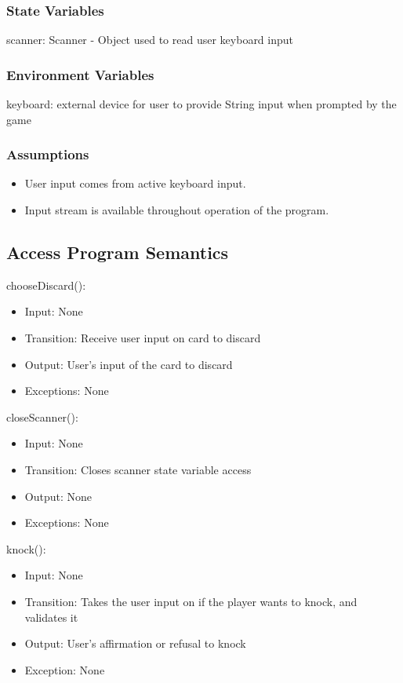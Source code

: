 \documentclass[12pt, titlepage]{article}
\begin{document}
\subsubsection{State Variables}
scanner: Scanner - Object used to read user keyboard input

\subsubsection{Environment Variables}
keyboard: external device for user to provide String input when prompted by the game

\subsubsection{Assumptions}
\begin{itemize}
    \item User input comes from active keyboard input.
    \item Input stream is available throughout operation of the program.
\end{itemize}

\subsection{Access Program Semantics}
chooseDiscard():
\begin{itemize}
    \item Input: None
    \item Transition: Receive user input on card to discard
    \item Output: User's input of the card to discard
    \item Exceptions: None
\end{itemize}

\noindent closeScanner():
\begin{itemize}
    \item Input: None
    \item Transition: Closes scanner state variable access
    \item Output: None
    \item Exceptions: None
\end{itemize}

\noindent knock():
\begin{itemize}
    \item Input: None
    \item Transition: Takes the user input on if the player wants to knock, and validates it
    \item Output: User's affirmation or refusal to knock
    \item Exception: None
\end{itemize}
\end{document}
